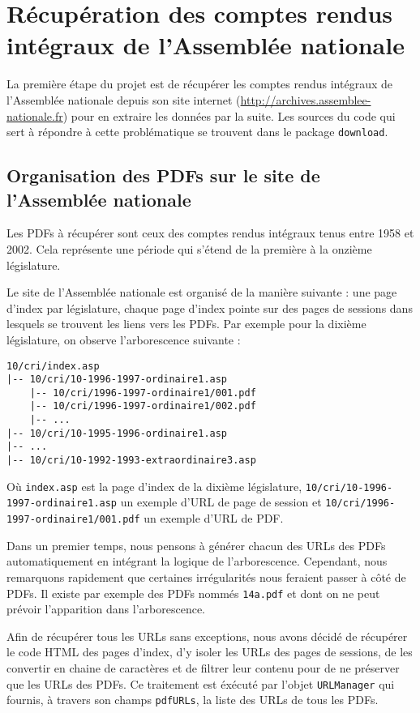 \section[Récupération des comptes rendus intégraux]{Récupération des comptes rendus intégraux de l'Assemblée nationale}

La première étape du projet est de récupérer les comptes rendus intégraux de l'Assemblée nationale depuis son site internet (\url{http://archives.assemblee-nationale.fr}) pour en extraire les données par la suite. Les sources du code qui sert à répondre à cette problématique se trouvent dans le package \verb|download|.

\subsection{Organisation des PDFs sur le site de l'Assemblée nationale}

Les PDFs à récupérer sont ceux des comptes rendus intégraux tenus entre 1958 et 2002. Cela représente une période qui s'étend de la première à la onzième législature.

Le site de l'Assemblée nationale est organisé de la manière suivante : une page d'index par législature, chaque page d'index pointe sur des pages de sessions dans lesquels se trouvent les liens vers les PDFs. Par exemple pour la dixième législature, on observe l'arborescence suivante :
\begin{verbatim}
10/cri/index.asp
|-- 10/cri/10-1996-1997-ordinaire1.asp
    |-- 10/cri/1996-1997-ordinaire1/001.pdf
    |-- 10/cri/1996-1997-ordinaire1/002.pdf
    |-- ...
|-- 10/cri/10-1995-1996-ordinaire1.asp
|-- ...
|-- 10/cri/10-1992-1993-extraordinaire3.asp
\end{verbatim}
Où \verb|index.asp| est la page d'index de la dixième législature, \verb|10/cri/10-1996-1997-ordinaire1.asp| un exemple d'URL de page de session et \verb|10/cri/1996-1997-ordinaire1/001.pdf| un exemple d'URL de PDF.

Dans un premier temps, nous pensons à générer chacun des URLs des PDFs automatiquement en intégrant la logique de l'arborescence. Cependant, nous remarquons rapidement que certaines irrégularités nous feraient passer à côté de PDFs. Il existe par exemple des PDFs nommés \verb|14a.pdf| et dont on ne peut prévoir l'apparition dans l'arborescence.

Afin de récupérer tous les URLs sans exceptions, nous avons décidé de récupérer le code HTML des pages d'index, d'y isoler les URLs des pages de sessions, de les convertir en chaine de caractères et de filtrer leur contenu pour de ne préserver que les URLs des PDFs. Ce traitement est éxécuté par l'objet \verb|URLManager| qui fournis, à travers son champs \verb|pdfURLs|, la liste des URLs de tous les PDFs.

